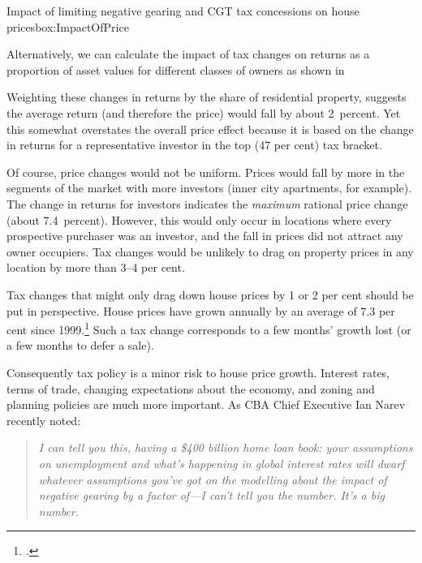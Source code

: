 \documentclass{grattanAlpha}\usepackage[]{graphicx}\usepackage[]{color}
\begin{document}
\begin{bigbox*}{Impact of limiting negative gearing {and CGT} tax concessions on house prices}{box:ImpactOfPrice}
\begin{table}[H]
{}
\vspace*{5.5pt}

\end{table}
Alternatively, we can calculate the impact of tax changes on returns as a proportion of asset values for different classes of owners as shown in

Weighting these changes in returns by the share of residential property, suggests the average return (and therefore the price) would fall by about 2~percent. Yet this somewhat overstates the overall price effect because it is based on the change in returns for a representative investor in the top (47 per cent) tax bracket.

Of course, price changes would not be uniform. Prices would fall by more in the segments of the market with more investors (inner city apartments, for example). The change in returns for investors indicates the \emph{maximum} rational price change (about 7.4~percent). However, this would only occur in locations where every prospective purchaser was an investor, and the fall in prices did not attract any owner occupiers. Tax changes would be unlikely to drag on property prices in any location by more than 3--4 per cent.

\end{bigbox*}

Tax changes that might only drag down house prices by 1 or 2 per cent should be put in perspective. House prices have grown annually by an average of 7.3 per cent since 1999.\footcites{ABS2015ResidentialPropertyIndex}{Yates2011}
Such a tax change corresponds to a few months’ growth lost (or a few months to defer a sale).

Consequently tax policy is a minor risk to house price growth.  Interest rates, terms of trade, changing expectations about the economy, and zoning and planning policies are much more important. As CBA Chief Executive Ian Narev recently noted:

\begin{quote} 
\textit{I can tell you this, having a \$400 billion home loan book: your assumptions on unemployment and what's happening in global interest rates will dwarf whatever assumptions you've got on the modelling about the impact of negative gearing by a factor of---I can't tell you the number. It's a big number.}
\end{quote}
\end{document}
